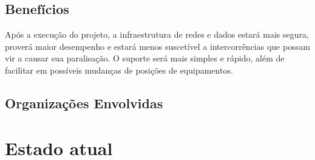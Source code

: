 \documentclass[	DIV=calc,%
							paper=a4,%
							fontsize=12pt,%
							onecolumn]{scrartcl}	 					%
\begin{document}
\subsection{Benefícios}
Após a execução do projeto, a infraestrutura de redes e dados estará mais segura, proverá maior desempenho e estará menos suscetível a intercorrências que possam vir a causar sua paralisação. O suporte será mais simples e rápido, além de facilitar em possíveis mudanças de posições de equipamentos.

\subsection{Organizações Envolvidas}


\section{Estado atual}

\end{document}
